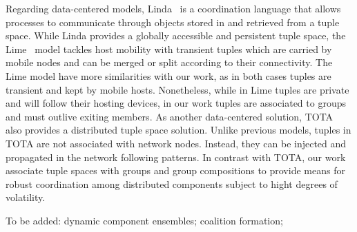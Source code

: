 

Regarding data-centered models, Linda~\cite{Gelernter:1985} is a coordination language that allows processes to communicate through objects stored in and retrieved from a tuple space. While Linda provides a globally accessible and persistent tuple space, the Lime~\cite{Murphy:2006} model tackles host mobility with transient tuples which are carried by mobile nodes and can be merged or split according to their connectivity. The Lime model have more similarities with our work, as in both cases tuples are transient and kept by mobile hosts. Nonetheless, while in Lime tuples are private and will follow their hosting devices, in our work tuples are associated to groups and must outlive exiting members. As another data-centered solution, TOTA~\cite{Mamei:2003} also provides a distributed tuple space solution. Unlike previous models, tuples in TOTA are not associated with network nodes. Instead, they can be injected and propagated in the network following patterns. %
In contrast with TOTA, our work associate tuple spaces with groups and group compositions to provide means for robust coordination among distributed components subject to hight degrees of volatility.

To be added: dynamic component ensembles; coalition formation;





